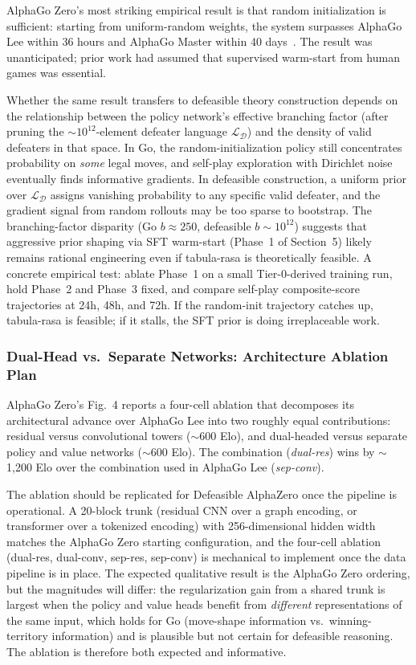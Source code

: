 \documentclass{article}
\newcommand{\D}{\mathcal{D}}
\begin{document}
AlphaGo Zero's most striking empirical result is that random initialization is sufficient: starting from uniform-random weights, the system surpasses AlphaGo Lee within 36 hours and AlphaGo Master within 40 days~\cite{silver2017alphagozero}. The result was unanticipated; prior work had assumed that supervised warm-start from human games was essential.

Whether the same result transfers to defeasible theory construction depends on the relationship between the policy network's effective branching factor (after pruning the $\sim 10^{12}$-element defeater language $\mathcal{L}_\D$) and the density of valid defeaters in that space. In Go, the random-initialization policy still concentrates probability on \emph{some} legal moves, and self-play exploration with Dirichlet noise eventually finds informative gradients. In defeasible construction, a uniform prior over $\mathcal{L}_\D$ assigns vanishing probability to any specific valid defeater, and the gradient signal from random rollouts may be too sparse to bootstrap. The branching-factor disparity (Go $b \approx 250$, defeasible $b \sim 10^{12}$) suggests that aggressive prior shaping via SFT warm-start (Phase~1 of Section~5) likely remains rational engineering even if tabula-rasa is theoretically feasible. A concrete empirical test: ablate Phase~1 on a small Tier-0-derived training run, hold Phase~2 and Phase~3 fixed, and compare self-play composite-score trajectories at 24h, 48h, and 72h. If the random-init trajectory catches up, tabula-rasa is feasible; if it stalls, the SFT prior is doing irreplaceable work.

\subsubsection{Dual-Head vs.\ Separate Networks: Architecture Ablation Plan}

AlphaGo Zero's Fig.~4 reports a four-cell ablation that decomposes its architectural advance over AlphaGo Lee into two roughly equal contributions: residual versus convolutional towers ($\sim$600 Elo), and dual-headed versus separate policy and value networks ($\sim$600 Elo). The combination (\emph{dual-res}) wins by $\sim$1{,}200 Elo over the combination used in AlphaGo Lee (\emph{sep-conv}).

The ablation should be replicated for Defeasible AlphaZero once the pipeline is operational. A 20-block trunk (residual CNN over a graph encoding, or transformer over a tokenized encoding) with 256-dimensional hidden width matches the AlphaGo Zero starting configuration, and the four-cell ablation (dual-res, dual-conv, sep-res, sep-conv) is mechanical to implement once the data pipeline is in place. The expected qualitative result is the AlphaGo Zero ordering, but the magnitudes will differ: the regularization gain from a shared trunk is largest when the policy and value heads benefit from \emph{different} representations of the same input, which holds for Go (move-shape information vs.\ winning-territory information) and is plausible but not certain for defeasible reasoning. The ablation is therefore both expected and informative.
\end{document}
